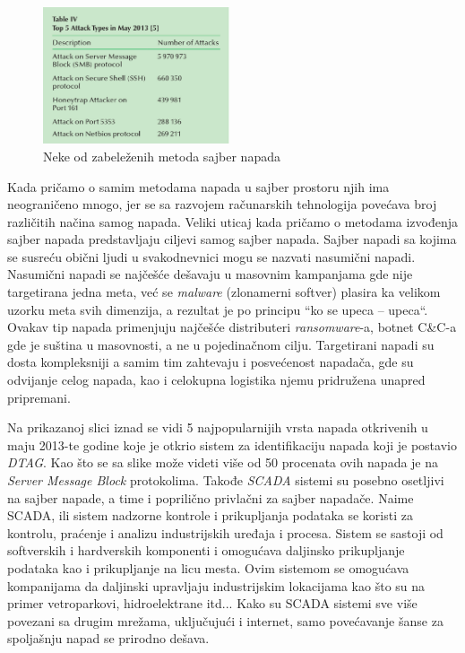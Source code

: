 \documentclass[a4paper]{article}
\begin{document}
{ \begin{figure}[h!]
  \centering
  \begin{center}
  \includegraphics[width=55mm]{slika2.jpg}
  \end{center}
  \caption{Neke od zabeleženih metoda sajber napada}
  \label{fig:vr1}
\end{figure}


Kada pričamo o samim metodama napada u sajber prostoru njih ima neograničeno mnogo, jer se sa razvojem računarskih tehnologija povećava broj različitih načina samog napada. Veliki uticaj kada pričamo o metodama izvođenja sajber napada predstavljaju ciljevi samog sajber napada. Sajber napadi sa kojima se susreću obični ljudi u svakodnevnici mogu se nazvati nasumični napadi. Nasumični napadi se najčešće dešavaju u masovnim kampanjama gde nije targetirana jedna meta, već se \emph{malware} (zlonamerni softver) plasira ka velikom uzorku meta svih dimenzija, a rezultat je po principu “ko se upeca – upeca“. Ovakav tip napada primenjuju najčešće distributeri \emph{ransomware}-a, botnet C&C-a gde je suština u masovnosti, a ne u pojedinačnom cilju.
Targetirani napadi su dosta kompleksniji a samim tim zahtevaju i posvećenost napadača, gde su odvijanje celog napada, kao i celokupna logistika njemu pridružena unapred pripremani.

Na prikazanoj slici iznad se vidi 5 najpopularnijih vrsta napada otkrivenih u maju 2013-te godine koje je otkrio sistem za identifikaciju napada koji je postavio \emph{DTAG}. Kao što se sa slike može videti više od 50 procenata ovih napada je na \emph{Server Message Block} protokolima.
Takođe \emph{SCADA} sistemi su posebno osetljivi na sajber napade, a time i poprilično privlačni za sajber napadače. Naime SCADA, ili sistem nadzorne kontrole i prikupljanja podataka se koristi za kontrolu, praćenje i analizu industrijskih uređaja i procesa.
Sistem se sastoji od softverskih i hardverskih komponenti i omogućava daljinsko prikupljanje podataka kao i prikupljanje na licu mesta. Ovim sistemom se omogućava kompanijama da daljinski upravljaju industrijskim lokacijama kao što su na primer vetroparkovi, hidroelektrane itd...
Kako su SCADA sistemi sve više povezani sa drugim mrežama, uključujući i internet, samo povećavanje šanse za spoljašnju napad se prirodno dešava.



}
\end{document}
